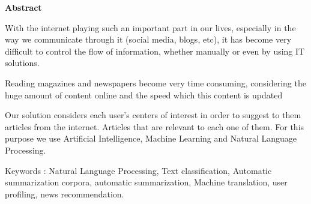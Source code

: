 \begin{center}
    \Large 
    \textbf{Abstract}
\end{center}

With the internet playing such an important part in our lives, especially in the way we communicate through it (social media, blogs, etc), it has become very difficult to control the flow of information, whether manually or even by using IT solutions.

Reading magazines and newspapers become very time consuming, considering the huge amount of content online and the speed which this content is updated

Our solution considers each user's centers of interest in order to suggest to them articles from the internet. Articles that are relevant to each one of them. For this purpose we use Artificial Intelligence, Machine Learning and Natural Language Processing.

\noindent
Keywords : Natural Language Processing, Text classification, Automatic summarization corpora, automatic summarization, Machine translation, user profiling, news recommendation. 